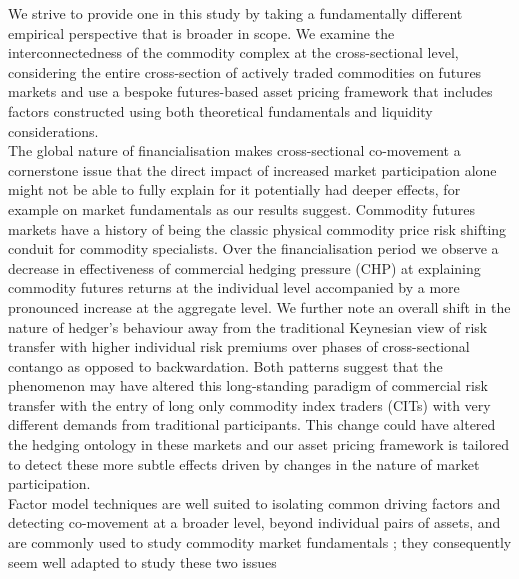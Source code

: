 \documentclass[
  authoryear,
  preprint,
  3p]{elsarticle}
\begin{document}
\medskip

We strive to provide one in this study by taking a fundamentally
different empirical perspective that is broader in scope. We examine the
interconnectedness of the commodity complex at the cross-sectional
level, considering the entire cross-section of actively traded
commodities on futures markets and use a bespoke futures-based asset
pricing framework that includes factors constructed using both
theoretical fundamentals and liquidity considerations.\\
The global nature of financialisation makes cross-sectional co-movement
a cornerstone issue that the direct impact of increased market
participation alone might not be able to fully explain for it
potentially had deeper effects, for example on market fundamentals as
our results suggest. Commodity futures markets have a history of being
the classic physical commodity price risk shifting conduit for commodity
specialists. Over the financialisation period we observe a decrease in
effectiveness of commercial hedging pressure (CHP) at explaining
commodity futures returns at the individual level accompanied by a more
pronounced increase at the aggregate level. We further note an overall
shift in the nature of hedger's behaviour away from the traditional
Keynesian view of risk transfer with higher individual risk premiums
over phases of cross-sectional contango as opposed to backwardation.
Both patterns suggest that the phenomenon may have altered this
long-standing paradigm of commercial risk transfer with the entry of
long only commodity index traders (CITs) with very different demands
from traditional participants. This change could have altered the
hedging ontology in these markets and our asset pricing framework is
tailored to detect these more subtle effects driven by changes in the
nature of market participation.\\
Factor model techniques are well suited to isolating common driving
factors and detecting co-movement
\citep{fama_common_1993, carhart_persistence_1997, asness_devil_2013, fama_five_factor_2015, hou_digesting_2015, asness_fact_2015, frazzini_betting_2014, asness_quality_2019}
at a broader level, beyond individual pairs of assets, and are commonly
used to study commodity market fundamentals
\citep{schwartz_short_2000, miffre_momentum_2007, gorton_fundamentals_2012, cortazar_commodity_2013, yang_investment_2013, daskalaki_factors_2014, szymanowska_anatomy_2014, fernandez_skewness_2018, bakshi_understanding_2019, boons_basis_2019, sakkas_factor_2020};
they consequently seem well adapted to study these two issues
\end{document}
